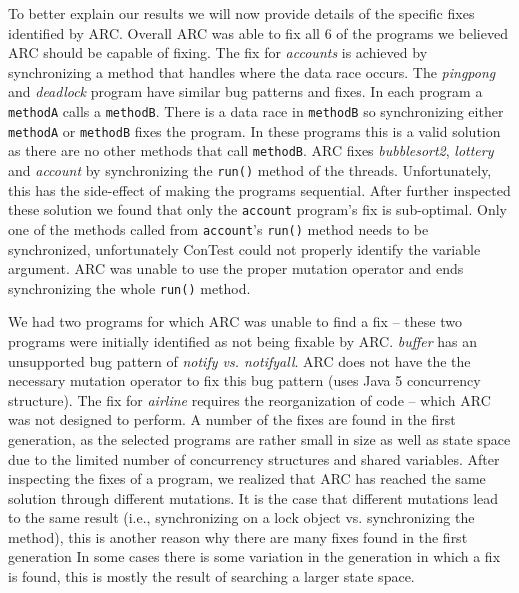 
To better explain our results we will now provide details of the specific fixes identified by ARC. Overall ARC was able to fix all 6 of the programs we believed ARC should be capable of fixing. The fix for \textit{accounts} is achieved by synchronizing a method that handles where the data race occurs.  The \textit{pingpong} and
\textit{deadlock} program have similar bug patterns and fixes.  In each program
a \texttt{methodA} calls a \texttt{methodB}.  There is a data race in
\texttt{methodB} so synchronizing either \texttt{methodA} or \texttt{methodB}
fixes the program.  In these programs this is a valid solution as there are no
other methods that call \texttt{methodB}.  ARC fixes \textit{bubblesort2}, \textit{lottery} and \textit{account} by synchronizing the \texttt{run()} method of the threads.  Unfortunately, this has the side-effect of making the
programs sequential.  After further inspected these solution we found that only the \texttt{account} program's fix is sub-optimal.  Only one of the
methods called from \texttt{account}'s  \texttt{run()} method  needs to be
synchronized, unfortunately ConTest could not properly identify the variable
argument. ARC was unable to use the proper mutation operator and ends synchronizing the whole \texttt{run()} method.

We had two programs for which ARC was unable to find a fix -- these two programs were initially identified as not being fixable by ARC. \textit{buffer} has an unsupported bug pattern of
\textit{notify vs. notifyall}. ARC does not have the the necessary mutation
operator to fix this bug pattern (uses Java 5 concurrency structure). The fix
for \textit{airline} requires the reorganization of code -- which ARC was not
designed to perform.  A number of the fixes are found in the first generation,
as the selected programs are rather small in size as well as state space due to
the limited number of concurrency structures and shared variables.  After
inspecting the fixes of a program, we realized that ARC has reached the same
solution through different mutations. It is the case that different mutations
lead to the same result (i.e., synchronizing on a lock object vs. synchronizing
the method), this is another reason why there are many fixes found in the first
generation  In  some cases there is some variation in the generation in which a
fix is found, this is mostly the result of searching a larger state space.

